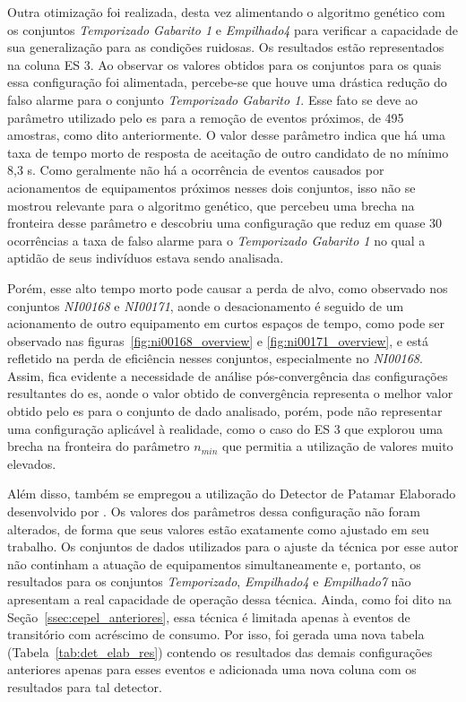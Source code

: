Outra otimização foi realizada, desta vez alimentando o algoritmo
genético com os conjuntos \emph{Temporizado Gabarito 1} e
\emph{Empilhado4} para verificar a capacidade de sua generalização
para as condições ruidosas. Os resultados estão representados na
coluna ES 3. Ao observar os valores obtidos para os conjuntos para os
quais essa configuração foi alimentada, percebe-se que houve uma
drástica redução do falso alarme para o conjunto \emph{Temporizado
Gabarito 1}. Esse fato se deve ao parâmetro utilizado pelo \acs{es}
para a remoção de eventos próximos, de 495 amostras, como dito
anteriormente. O valor desse parâmetro indica que há uma taxa de tempo
morto de resposta de aceitação de outro candidato de no mínimo 8,3 s.
Como geralmente não há a ocorrência de eventos causados por
acionamentos de equipamentos próximos nesses dois conjuntos, isso não
se mostrou relevante para o algoritmo genético, que percebeu uma
brecha na fronteira desse parâmetro e descobriu uma configuração que
reduz em quase 30 ocorrências a taxa de falso alarme para o
\emph{Temporizado Gabarito 1} no qual a aptidão de seus indivíduos
estava sendo analisada. 

Porém, esse alto tempo morto pode causar a
perda de alvo, como observado nos conjuntos \emph{NI00168} e
\emph{NI00171}, aonde o desacionamento é seguido de um acionamento de
outro equipamento em curtos espaços de tempo, como pode ser observado
nas figuras~\ref{fig:ni00168_overview} e \ref{fig:ni00171_overview}, e
está refletido na perda de eficiência nesses conjuntos, especialmente
no \emph{NI00168}. Assim, fica evidente a necessidade de análise
pós-convergência das configurações resultantes do \acs{es}, aonde o
valor obtido de convergência representa o melhor valor obtido pelo
\acs{es} para o conjunto de dado analisado, porém, pode não
representar uma configuração aplicável à realidade, como o caso do ES
3 que explorou uma brecha na fronteira do parâmetro $n_{min}$ que
permitia a utilização de valores muito elevados.

Além disso, também se empregou a utilização do Detector de Patamar
Elaborado desenvolvido por \citet*{nilm_cepel_alvaro}. Os valores dos
parâmetros dessa configuração não foram alterados, de forma que seus
valores estão exatamente como ajustado em seu trabalho. Os conjuntos de
dados utilizados para o ajuste da técnica por esse autor não continham
a atuação de equipamentos simultaneamente e, portanto, os resultados
para os conjuntos \emph{Temporizado}, \emph{Empilhado4} e
\emph{Empilhado7} não apresentam a real capacidade de operação dessa
técnica. Ainda, como foi dito na
Seção~\ref{ssec:cepel_anteriores}, essa técnica é limitada apenas à
eventos de transitório com acréscimo de consumo. Por isso, foi gerada
uma nova tabela (Tabela~\ref{tab:det_elab_res}) contendo os resultados
das demais configurações anteriores apenas para esses eventos e
adicionada uma nova coluna com os resultados para tal detector.

